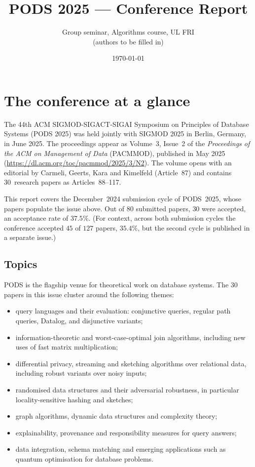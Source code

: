 \documentclass[11pt,a4paper]{article}
\title{PODS 2025 --- Conference Report}
\author{Group seminar, Algorithms course, UL FRI \\ \small{(authors to be filled in)}}
\date{\today}
\begin{document}
\maketitle

\section{The conference at a glance}

The 44th ACM SIGMOD-SIGACT-SIGAI Symposium on Principles of Database Systems
(PODS 2025) was held jointly with SIGMOD 2025 in Berlin, Germany, in June 2025.
The proceedings appear as Volume~3, Issue~2 of the \emph{Proceedings of the ACM
on Management of Data} (PACMMOD), published in May 2025
(\url{https://dl.acm.org/toc/pacmmod/2025/3/N2}). The volume opens with an
editorial by Carmeli, Geerts, Kara and Kimelfeld (Article~87) and contains
30~research papers as Articles~88--117.

This report covers the December~2024 submission cycle of PODS~2025, whose
papers populate the issue above. Out of $80$ submitted papers, $30$ were
accepted, an acceptance rate of $37.5\%$. (For context, across both
submission cycles the conference accepted $45$ of $127$ papers, $35.4\%$, but
the second cycle is published in a separate issue.)

\subsection*{Topics}

PODS is the flagship venue for theoretical work on database systems. The 30
papers in this issue cluster around the following themes:

\begin{itemize}[leftmargin=*,itemsep=0pt]
  \item query languages and their evaluation: conjunctive queries, regular
        path queries, Datalog, and disjunctive variants;
  \item information-theoretic and worst-case-optimal join algorithms,
        including new uses of fast matrix multiplication;
  \item differential privacy, streaming and sketching algorithms over
        relational data, including robust variants over noisy inputs;
  \item randomised data structures and their adversarial robustness, in
        particular locality-sensitive hashing and sketches;
  \item graph algorithms, dynamic data structures and complexity theory;
  \item explainability, provenance and responsibility measures for query
        answers;
  \item data integration, schema matching and emerging applications such as
        quantum optimisation for database problems.
\end{itemize}
\end{document}

